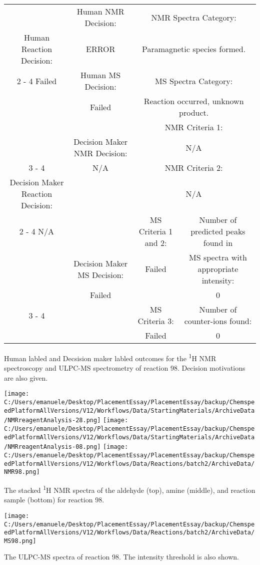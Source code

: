 \documentclass{article}%
\begin{document}
\begin{Decision Table}[H]%
\begin{tabular}{|c|c|c|c|}%
\hline%
&Human NMR Decision:&\multicolumn{2}{|c|}{NMR Spectra Category:}\\%
Human Reaction Decision:&ERROR&\multicolumn{2}{|c|}{Paramagnetic species formed.}\\%
\cline{2%
-%
4}%
Failed&Human MS Decision:&\multicolumn{2}{|c|}{MS Spectra Category:}\\%
&Failed&\multicolumn{2}{|c|}{Reaction occurred, unknown product.}\\%
\hline%
&&\multicolumn{2}{|c|}{NMR Criteria 1:}\\%
&Decision Maker NMR Decision:&\multicolumn{2}{|c|}{N/A}\\%
\cline{3%
-%
4}%
&N/A&\multicolumn{2}{|c|}{NMR Criteria 2:}\\%
Decision Maker Reaction Decision:&&\multicolumn{2}{|c|}{N/A}\\%
\cline{2%
-%
4}%
N/A&&MS Criteria 1 and 2:&Number of predicted peaks found in\\%
&Decision Maker MS Decision:&Failed&MS spectra with appropriate intensity:\\%
&Failed&&0\\%
\cline{3%
-%
4}%
&&MS Criteria 3:&Number of counter{-}ions found:\\%
&&Failed&0\\%
\hline%
\end{tabular}%
\caption{Human labled and Decsision maker labled outcomes for the \textsuperscript{1}H NMR spectroscopy and ULPC-MS spectrometry of reaction 98. Decision motivations are also given.}%
\end{Decision Table}%
\begin{NMR Spectra}[H]%
\begin{center}%
\texttt{[image: C:/Users/emanuele/Desktop/PlacementEssay/PlacementEssay/backup/ChemspeedPlatformAllVersions/V12/Workflows/Data/StartingMaterials/ArchiveData/NMRreagentAnalysis-28.png]}\hfill%
\texttt{[image: C:/Users/emanuele/Desktop/PlacementEssay/PlacementEssay/backup/ChemspeedPlatformAllVersions/V12/Workflows/Data/StartingMaterials/ArchiveData/NMRreagentAnalysis-08.png]}\hfill%
\texttt{[image: C:/Users/emanuele/Desktop/PlacementEssay/PlacementEssay/backup/ChemspeedPlatformAllVersions/V12/Workflows/Data/Reactions/batch2/ArchiveData/NMR98.png]}\hfill%
\end{center}%
\caption{The stacked \textsuperscript{1}H NMR spectra of the aldehyde (top), amine (middle), and reaction sample (bottom) for reaction 98.}%
\end{NMR Spectra}%
\begin{MS Spectra}[H]%
\begin{center}%
\texttt{[image: C:/Users/emanuele/Desktop/PlacementEssay/PlacementEssay/backup/ChemspeedPlatformAllVersions/V12/Workflows/Data/Reactions/batch2/ArchiveData/MS98.png]}\hfill%
\end{center}%
\caption{The ULPC-MS spectra of reaction 98. The intensity threshold is also shown.}%
\end{MS Spectra}%
\end{document}
